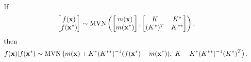 \begin{theorem}
    \label{thm:cond_mvn}
    If
    $$
        \begin{bmatrix}
            f(\mathbf{x}) \\
            f(\mathbf{x}^\ast)
        \end{bmatrix} \sim \operatorname{MVN}\left(
        \begin{bmatrix}
                m(\mathbf{x}) \\
                m(\mathbf{x}^\ast)
            \end{bmatrix}, \begin{bmatrix}
                K            & K^{*}  \\
                (K^{\ast})^T & K^{**}
            \end{bmatrix}
        \right),
    $$
    then
    $$
        f(\mathbf{x}) | f(\mathbf{x}^\ast)
        \sim \operatorname{MVN}\left(
        m(\mathbf{x}) + K^{*}(K^{**})^{-1}(f(\mathbf{x}^\ast) - m(\mathbf{x}^\ast)), \,\,
        K - K^{\ast}(K^{**})^{-1}(K^{\ast})^T
        \right).
    $$
\end{theorem}
